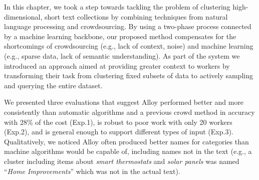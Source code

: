 

In this chapter, we took a step towards tackling
the problem of clustering high-dimensional, 
short text collections by combining techniques from natural language processing and
crowdsourcing.  By using a two-phase process connected by a machine learning backbone,
our proposed method compensates
for the shortcomings of crowdsourcing (e.g., lack of context, noise) and
machine learning (e.g., sparse data, lack of semantic understanding). As part of the system we introduced an approach aimed at providing greater context to workers by transforming their task from clustering fixed subsets of data to actively sampling and querying the entire dataset. 

We presented three evaluations that suggest Alloy performed better 
and more consistently than automatic
algorithms and a previous crowd method in accuracy with 28\% of the cost
(Exp.1), is robust to poor work with only 20 workers (Exp.2),
and is general enough to support different types of input (Exp.3).
Qualitatively, we noticed Alloy often produced better names for categories than
machine algorithms would be capable of, including names not in the text (e.g., a cluster 
including items about \emph{smart thermostats} and \emph{solar panels} was
named ``\emph{Home Improvements}'' which was not in the actual text).


